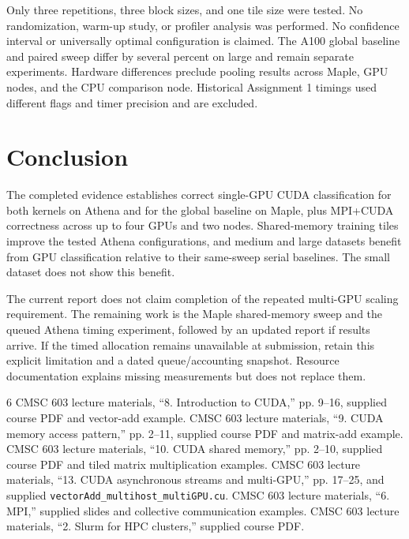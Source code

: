 \documentclass[conference]{IEEEtran}
\begin{document}
Only three repetitions, three block sizes, and one tile size were tested. No randomization, warm-up study, or profiler analysis was performed. No confidence interval or universally optimal configuration is claimed. The A100 global baseline and paired sweep differ by several percent on large and remain separate experiments. Hardware differences preclude pooling results across Maple, GPU nodes, and the CPU comparison node. Historical Assignment 1 timings used different flags and timer precision and are excluded.

\section{Conclusion}
The completed evidence establishes correct single-GPU CUDA classification for both kernels on Athena and for the global baseline on Maple, plus MPI+CUDA correctness across up to four GPUs and two nodes. Shared-memory training tiles improve the tested Athena configurations, and medium and large datasets benefit from GPU classification relative to their same-sweep serial baselines. The small dataset does not show this benefit.

The current report does not claim completion of the repeated multi-GPU scaling requirement. The remaining work is the Maple shared-memory sweep and the queued Athena timing experiment, followed by an updated report if results arrive. If the timed allocation remains unavailable at submission, retain this explicit limitation and a dated queue/accounting snapshot. Resource documentation explains missing measurements but does not replace them.

\begin{thebibliography}{6}
 CMSC 603 lecture materials, ``8. Introduction to CUDA,'' pp. 9--16, supplied course PDF and vector-add example.
 CMSC 603 lecture materials, ``9. CUDA memory access pattern,'' pp. 2--11, supplied course PDF and matrix-add example.
 CMSC 603 lecture materials, ``10. CUDA shared memory,'' pp. 2--10, supplied course PDF and tiled matrix multiplication examples.
 CMSC 603 lecture materials, ``13. CUDA asynchronous streams and multi-GPU,'' pp. 17--25, and supplied \texttt{vectorAdd\_multihost\_multiGPU.cu}.
 CMSC 603 lecture materials, ``6. MPI,'' supplied slides and collective communication examples.
 CMSC 603 lecture materials, ``2. Slurm for HPC clusters,'' supplied course PDF.
\end{thebibliography}
\end{document}
